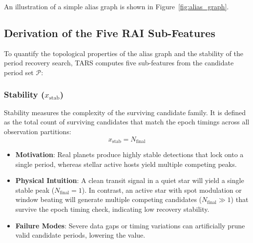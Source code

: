 An illustration of a simple alias graph is shown in Figure~\ref{fig:alias_graph}.

\subsection{Derivation of the Five RAI Sub-Features} \label{sec:method_features}
To quantify the topological properties of the alias graph and the stability of the period recovery search, TARS computes five sub-features from the candidate period set $\mathcal{P}$:

\subsubsection{Stability ($x_{\text{stab}}$)}
Stability measures the complexity of the surviving candidate family. It is defined as the total count of surviving candidates that match the epoch timings across all observation partitions:
\begin{equation}
x_{\text{stab}} = N_{\text{final}}
\label{eq:stab}
\end{equation}
\begin{itemize}
\item \textbf{Motivation}: Real planets produce highly stable detections that lock onto a single period, whereas stellar active hosts yield multiple competing peaks.
\item \textbf{Physical Intuition}: A clean transit signal in a quiet star will yield a single stable peak ($N_{\text{final}} = 1$). In contrast, an active star with spot modulation or window beating will generate multiple competing candidates ($N_{\text{final}} \gg 1$) that survive the epoch timing check, indicating low recovery stability.
\item \textbf{Failure Modes}: Severe data gaps or timing variations can artificially prune valid candidate periods, lowering the value.
\end{itemize}

